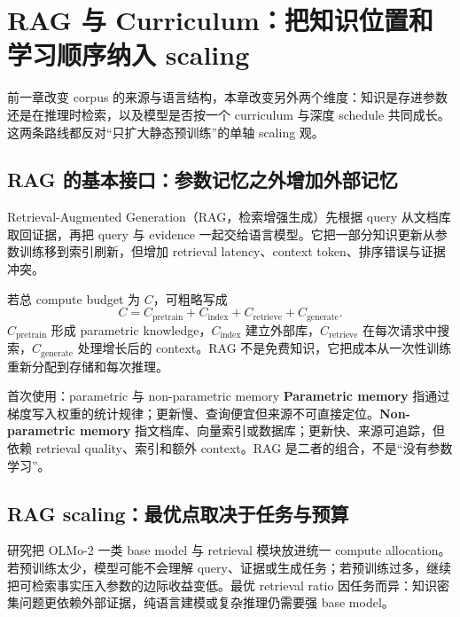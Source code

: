 \section{RAG 与 Curriculum：把知识位置和学习顺序纳入 scaling}

前一章改变 corpus 的来源与语言结构，本章改变另外两个维度：知识是存进参数还是在推理时检索，以及模型是否按一个 curriculum 与深度 schedule 共同成长。这两条路线都反对“只扩大静态预训练”的单轴 scaling 观。

\subsection{RAG 的基本接口：参数记忆之外增加外部记忆}

Retrieval-Augmented Generation（RAG，检索增强生成）先根据 query 从文档库取回证据，再把 query 与 evidence 一起交给语言模型。它把一部分知识更新从参数训练移到索引刷新，但增加 retrieval latency、context token、排序错误与证据冲突。



若总 compute budget 为 $C$，可粗略写成
\[
C=C_{\mathrm{pretrain}}+C_{\mathrm{index}}+C_{\mathrm{retrieve}}+C_{\mathrm{generate}}.
\]
$C_{\mathrm{pretrain}}$ 形成 parametric knowledge，$C_{\mathrm{index}}$ 建立外部库，$C_{\mathrm{retrieve}}$ 在每次请求中搜索，$C_{\mathrm{generate}}$ 处理增长后的 context。RAG 不是免费知识，它把成本从一次性训练重新分配到存储和每次推理。

\begin{knowledgebox}{首次使用：parametric 与 non-parametric memory}
\textbf{Parametric memory} 指通过梯度写入权重的统计规律；更新慢、查询便宜但来源不可直接定位。\textbf{Non-parametric memory} 指文档库、向量索引或数据库；更新快、来源可追踪，但依赖 retrieval quality、索引和额外 context。RAG 是二者的组合，不是“没有参数学习”。
\end{knowledgebox}

\subsection{RAG scaling：最优点取决于任务与预算}

研究把 OLMo-2 一类 base model 与 retrieval 模块放进统一 compute allocation。若预训练太少，模型可能不会理解 query、证据或生成任务；若预训练过多，继续把可检索事实压入参数的边际收益变低。最优 retrieval ratio 因任务而异：知识密集问题更依赖外部证据，纯语言建模或复杂推理仍需要强 base model。

